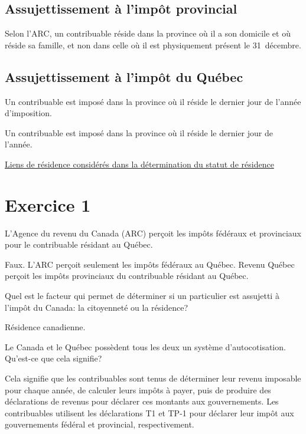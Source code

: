 \subsection{Assujettissement à l'impôt provincial}
\begin{note}
	Selon l'ARC, un contribuable réside dans la province où il a son domicile et où réside sa famille, et non dans celle où il est physiquement présent le 31~décembre.
\end{note}


\subsection{Assujettissement à l'impôt du Québec}
\begin{note}
	Un contribuable est imposé dans la province où il réside le dernier jour de l'année d'imposition.
\end{note}
Un contribuable est imposé dans la province où il réside le dernier jour de l'année.

\qct\href{https://www.revenuquebec.ca/fr/citoyens/votre-situation/statut-de-residence-et-assujettissement-a-limpot/liens-de-residence-consideres-dans-la-determination-du-statut-de-residence/}{Liens de résidence considérés dans la détermination du statut de résidence}



\section{Exercice 1}
\setcounter{question}{0}
\begin{question}
	L'Agence du revenu du Canada (ARC) perçoit les impôts fédéraux et provinciaux pour le contribuable résidant au Québec.
\end{question}
Faux. L'ARC perçoit seulement les impôts fédéraux au Québec. Revenu Québec perçoit les impôts provinciaux du contribuable résidant au Québec.

\begin{question}
	Quel est le facteur qui permet de déterminer si un particulier est assujetti à l'impôt du Canada: la citoyenneté ou la résidence?
\end{question}
Résidence canadienne.

\begin{question}
	Le Canada et le Québec possèdent tous les deux un système d'autocotisation. Qu'est-ce que cela signifie?
\end{question}
Cela signifie que les contribuables sont tenus de déterminer leur revenu imposable pour chaque année, de calculer leurs impôts à payer, puis de produire des déclarations de revenus pour déclarer ces montants aux gouvernements. Les contribuables utilisent les déclarations T1 et TP-1 pour déclarer leur impôt aux gouvernements fédéral et provincial, respectivement.

